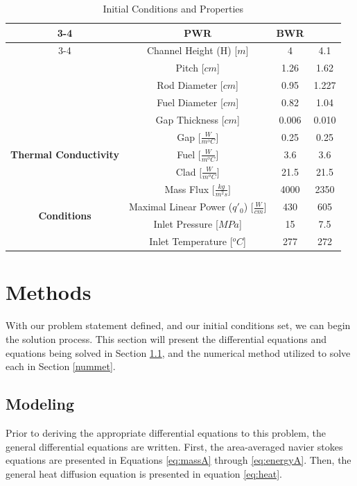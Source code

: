 \documentclass{article}
\begin{document}
\begin{table}[!hp!]
    \centering
    \caption{Initial Conditions and Properties}
    \label{tab:ICs}
    \renewcommand{\arraystretch}{1.5}
    \begin{tabular}{|c|c|c|c|}
         \cline{3-4}
         \multicolumn{2}{c|}{} & \textbf{PWR} & \textbf{BWR}\\
         \cline{3-4}
         \bottomrule
         \multirow{5}{*}{\textbf{Geometry}} &Channel Height (H) [$m$] & 4 & 4.1 \\
         &Pitch [$cm$]& 1.26 & 1.62 \\
         &Rod Diameter [$cm$]& 0.95& 1.227\\
         &Fuel Diameter [$cm$]& 0.82 & 1.04\\
         &Gap Thickness [$cm$]& 0.006 & 0.010 \\
         \toprule
         \bottomrule
         \multirow{3}{*}{\textbf{Thermal Conductivity}} & Gap $\bigr[\frac{W}{m^oC}\bigr]$& 0.25 & 0.25 \\
         &Fuel $\bigr[\frac{W}{m^oC}\bigr]$& 3.6 & 3.6\\
         &Clad $\bigr[\frac{W}{m^oC}\bigr]$& 21.5 & 21.5\\
         \toprule
         \bottomrule
         \multirow{4}{*}{\textbf{Conditions}}& Mass Flux $\bigr[\frac{kg}{m^2s}\bigr]$& 4000 & 2350 \\
         & Maximal Linear Power ($q'_0$) $\bigr[\frac{W}{cm}\bigr]$& 430 & 605 \\
         & Inlet Pressure [$MPa$]& 15 & 7.5 \\
         & Inlet Temperature [$^oC$]& 277 & 272 \\
         \toprule
         
    \end{tabular}
    
\end{table}

\clearpage
\section{Methods}
With our problem statement defined, and our initial conditions set, we can begin the solution process. This section will present the differential equations and equations being solved in Section \ref{modeling}, and the numerical method utilized to solve each in Section \ref{nummet}.

\subsection{Modeling}\label{modeling}
Prior to deriving the appropriate differential equations to this problem, the general differential equations are written. First, the area-averaged navier stokes equations are presented in Equations \ref{eq:massA} through \ref{eq:energyA}. Then, the general heat diffusion equation is presented in equation \ref{eq:heat}.
\end{document}
